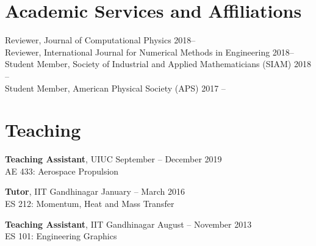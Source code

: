 \documentclass[margin]{res}
\begin{document}
\begin{resume}
\section{\large Academic Services and Affiliations}		 
Reviewer, Journal of Computational Physics \hfill 2018--\vspace{0.1cm}\\
Reviewer, International Journal for Numerical Methods in Engineering \hfill 2018--\vspace{0.1cm}\\
Student Member, Society of Industrial and Applied Mathematicians (SIAM) \hfill 2018 --\vspace{0.1cm}\\
Student Member, American Physical Society (APS) \hfill 2017 --
		 
\section{\large Teaching}
{\bf Teaching Assistant}, UIUC \hfill September -- December 2019 \\
AE 433: Aerospace Propulsion
\vspace{-0.1cm}

{\bf Tutor}, IIT Gandhinagar \hfill January -- March 2016 \\
ES 212: Momentum, Heat and Mass Transfer
\vspace{-0.1cm}

{\bf Teaching Assistant}, IIT Gandhinagar \hfill August -- November 2013 \\
ES 101: Engineering Graphics



\end{resume}
\end{document}
